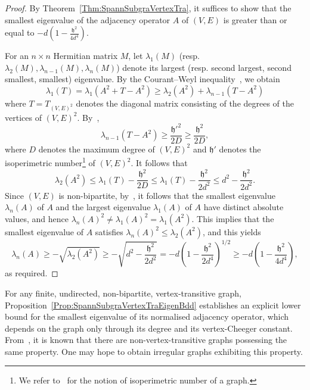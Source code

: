 \documentclass[ALCO,Unicode,published]{cedram}
\newcommand{\tth}{\ensuremath{\mathfrak{h}}}
\begin{document}
\begin{proof}
By Theorem~\ref{Thm:SpannSubgraVertexTra}, it suffices to show that the smallest eigenvalue of the adjacency operator $A$ of $(V, E)$ is greater than or equal to $
-d 
\left( 
1 - \frac{\tth^2}{4d^4}
\right)$. 

For an $n\times n$ Hermitian matrix $M$, let $\lambda_1(M)$ (resp. $\lambda_2(M), \lambda_{n-1}(M), \lambda_n(M)$) denote its largest (resp. second largest, second smallest, smallest) eigenvalue. By the Courant--Weyl inequality~\cite[Theorem 2.8.1]{BrouwerHaemersSpectraofGraphs}, 
we obtain 
$$\lambda_1(T) 
= \lambda_1(A^2 + T - A^2) 
\geq \lambda_2(A^2) + \lambda_{n-1}(T - A^2) $$
where $T = T_{(V, E)^2}$ denotes the diagonal matrix consisting of the degrees of the vertices of $(V, E)^2$. 
By~\cite[pp. 34--35]{ChungSpectralGraphTheory}, 
$$
\lambda_{n-1}(T - A^2) 
\geq \frac {\tth'^2}{2D} 
\geq \frac {\tth^2}{2D},$$
where $D$ denotes the maximum degree of $(V, E)^2$ and $\tth'$ denotes the isoperimetric number\footnote{We refer to~\cite[p. 34]{ChungSpectralGraphTheory} for the notion of isoperimetric number of a graph.} of $(V, E)^2$. It follows that
$$\lambda_2(A^2) 
\leq 
\lambda_1(T) - \frac {\tth^2}{2D}
\leq 
\lambda_1(T) - \frac {\tth^2}{2d^2} 
\leq d^2- \frac {\tth^2}{2d^2}. $$ 
Since $(V, E)$ is non-bipartite, by~\cite[Theorems 31.11, 31.12]{vanLintWilsonCourseCombi}, it follows that the smallest eigenvalue $\lambda_n(A)$ of $A$ and the largest eigenvalue $\lambda_1(A)$ of $A$ have distinct absolute values, and hence $\lambda_n(A)^2\neq \lambda_1(A)^2 = \lambda_1(A^2)$. This implies that the smallest eigenvalue of $A$ satisfies 
$\lambda_n(A)^2 \leq \lambda_2(A^2)$, and this yields 
$$\lambda_n(A)
\geq 
-\sqrt{\lambda_2(A^2)}
\geq
-\sqrt{ d^2 - \frac {\tth^2}{2d^2} }
= -d  \left(1 - \frac {\tth^2}{2d^4} \right)^{1/2}
\geq  -d  \left(1 - \frac {\tth^2}{4d^4} \right)
,$$
as required.
\end{proof}

For any finite, undirected, non-bipartite, vertex-transitive graph, Proposition~\ref{Prop:SpannSubgraVertexTraEigenBdd} establishes an explicit lower bound for the smallest eigenvalue of its normalised adjacency operator, which depends on the graph only through its degree and its vertex-Cheeger constant. From~\cite{CheegerTwisted}, it is known that there are non-vertex-transitive graphs possessing the same property. One may hope to obtain irregular graphs exhibiting this property. 
\end{document}
